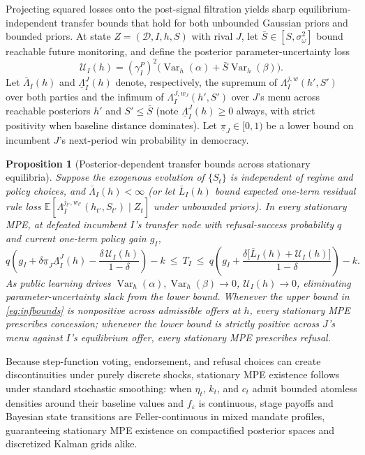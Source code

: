 \documentclass[11pt,letterpaper]{article}
\newtheorem{proposition}{Proposition}
\newcommand{\E}{\mathbb E}
\newcommand{\Var}{\operatorname{Var}}
\begin{document}
Projecting squared losses onto the post-signal filtration yields sharp equilibrium-independent transfer bounds that hold for both unbounded Gaussian priors and bounded priors. At state $Z=(\mathcal D,I,h,S)$ with rival $J$, let $\bar S\in[S,\sigma_\omega^2]$ bound reachable future monitoring, and define the posterior parameter-uncertainty loss
\[
 \mathcal U_I(h)=(\gamma_I^P)^2\big(\Var_h(\alpha)+\bar S\Var_h(\beta)\big).
\]
Let $\bar\Lambda_I(h)$ and $\underline\Lambda_I^J(h)$ denote, respectively, the supremum of $\Lambda_I^{j,w}(h',S')$ over both parties and the infimum of $\Lambda_I^{J,w_J}(h',S')$ over $J$'s menu across reachable posteriors $h'$ and $S'\le\bar S$ (note $\underline\Lambda_I^J(h)\ge 0$ always, with strict positivity when baseline distance dominates). Let $\underline\pi_J\in[0,1)$ be a lower bound on incumbent $J$'s next-period win probability in democracy.

\begin{proposition}[Posterior-dependent transfer bounds across stationary equilibria]\label{prop:infinite}
Suppose the exogenous evolution of $\{S_t\}$ is independent of regime and policy choices, and $\bar\Lambda_I(h)<\infty$ (or let $\bar L_I(h)$ bound expected one-term residual rule loss $\E[\Lambda_I^{j_{t'},w_{t'}}(h_{t'},S_{t'})\mid Z_t]$ under unbounded priors). In every stationary MPE, at defeated incumbent $I$'s transfer node with refusal-success probability $q$ and current one-term policy gain $g_I$,
\begin{equation}
 q\left(g_I+\delta\underline\pi_J\underline\Lambda_I^J(h)-\frac{\delta\,\mathcal U_I(h)}{1-\delta}\right)-k
 \ \le\ T_I\ \le\
 q\left(g_I+\frac{\delta\big[\bar L_I(h)+\mathcal U_I(h)\big]}{1-\delta}\right)-k .
 \label{eq:infbounds}
\end{equation}
As public learning drives $\Var_h(\alpha),\Var_h(\beta)\to 0$, $\mathcal U_I(h)\to 0$, eliminating parameter-uncertainty slack from the lower bound. Whenever the upper bound in \eqref{eq:infbounds} is nonpositive across admissible offers at $h$, every stationary MPE prescribes concession; whenever the lower bound is strictly positive across $J$'s menu against $I$'s equilibrium offer, every stationary MPE prescribes refusal.
\end{proposition}

Because step-function voting, endorsement, and refusal choices can create discontinuities under purely discrete shocks, stationary MPE existence follows under standard stochastic smoothing: when $\eta_t$, $k_t$, and $c_t$ admit bounded atomless densities around their baseline values and $f_\varepsilon$ is continuous, stage payoffs and Bayesian state transitions are Feller-continuous in mixed mandate profiles, guaranteeing stationary MPE existence on compactified posterior spaces and discretized Kalman grids alike.

\end{document}

